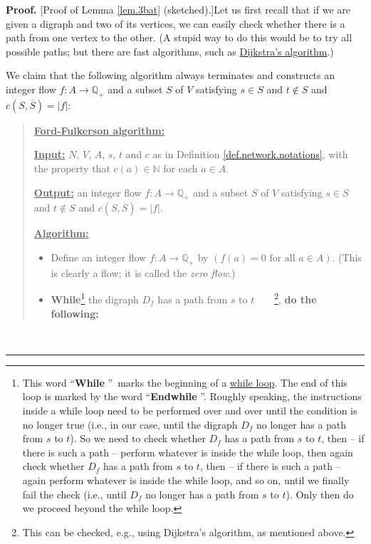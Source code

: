 \documentclass[numbers=enddot,12pt,final,onecolumn,notitlepage]{scrartcl}%
\theoremstyle{definition}
\newenvironment{statement}{\begin{quote}}{\end{quote}}
\newenvironment{proof}[1][Proof]{\noindent\textbf{#1.} }{\ \rule{0.5em}{0.5em}}
\begin{document}
\begin{proof}
[Proof of Lemma \ref{lem.3bat} (sketched).]Let us first recall that if we are
given a digraph and two of its vertices, we can easily check whether there is
a path from one vertex to the other. (A stupid way to do this would be to try
all possible paths; but there are fast algorithms, such as
\href{https://en.wikipedia.org/wiki/Dijkstra's_algorithm}{Dijkstra's
algorithm}.)

We claim that the following algorithm always terminates and constructs an
integer flow $f:A\rightarrow\mathbb{Q}_{+}$ and a subset $S$ of $V$ satisfying
$s\in S$ and $t\notin S$ and $c\left(  S,\overline{S}\right)  =\left\vert
f\right\vert $:

\begin{statement}
\underline{\textbf{Ford-Fulkerson algorithm:}}

\underline{\textbf{Input:}} $N$, $V$, $A$, $s$, $t$ and $c$ as in Definition
\ref{def.network.notations}, with the property that $c\left(  a\right)
\in\mathbb{N}$ for each $a\in A$.

\underline{\textbf{Output:}} an integer flow $f:A\rightarrow\mathbb{Q}_{+}$
and a subset $S$ of $V$ satisfying $s\in S$ and $t\notin S$ and $c\left(
S,\overline{S}\right)  =\left\vert f\right\vert $.

\underline{\textbf{Algorithm:}}

\begin{itemize}
\item Define an integer flow $f:A\rightarrow\mathbb{Q}_{+}$ by $\left(
f\left(  a\right)  =0\text{ for all }a\in A\right)  $. (This is clearly a
flow; it is called the \textit{zero flow}.)

\item \textbf{While}\footnote{This word \textquotedblleft\textbf{While}%
\textquotedblright\ marks the beginning of a
\href{https://en.wikipedia.org/wiki/While_loop}{while loop}. The end of this
loop is marked by the word \textquotedblleft\textbf{Endwhile}%
\textquotedblright. Roughly speaking, the instructions inside a while loop
need to be performed over and over until the condition is no longer true
(i.e., in our case, until the digraph $D_{f}$ no longer has a path from $s$ to
$t$). So we need to check whether $D_{f}$ has a path from $s$ to $t$, then --
if there is such a path -- perform whatever is inside the while loop, then
again check whether $D_{f}$ has a path from $s$ to $t$, then -- if there is
such a path -- again perform whatever is inside the while loop, and so on,
until we finally fail the check (i.e., until $D_{f}$ no longer has a path from
$s$ to $t$). Only then do we proceed beyond the while loop.} the digraph
$D_{f}$ has a path from $s$ to $t$\ \ \ \ \footnote{This can be checked, e.g.,
using Dijkstra's algorithm, as mentioned above.}, \textbf{do the following:}


\end{itemize}
\end{statement}
\end{proof}
\end{document}
